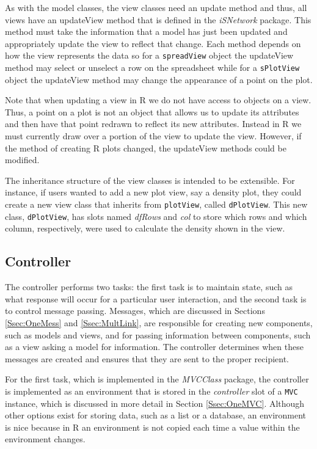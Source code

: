 \documentclass{article}[11pt]
\newcommand{\Rfunction}[1]{{\textsf{#1}}}
\newcommand{\Robject}[1]{{\texttt{#1}}}
\newcommand{\Rpackage}[1]{{\textit{#1}}}
\newcommand{\Rslot}[1]{\textsl{#1}}
\newcommand{\Rclass}[1]{\texttt{#1}}
\begin{document}
As with the model classes, the view classes need an update
method and thus, all views have an \Rfunction{updateView} method that is
defined in the \Rpackage{iSNetwork} package.  This method must take the
information that a model has just been updated and appropriately update the
view to reflect that change.  Each method depends on how the view
represents the data so for a \Robject{spreadView} object the
\Rfunction{updateView} method may select or unselect a row on the spreadsheet
while for a \Robject{sPlotView} object the \Rfunction{updateView} method may
change the appearance of a point on the plot.  

Note that when updating a view in \textsf{R} we do not have access to objects
on a view.  Thus, a point on a plot is not an object that allows us to update
its attributes and then have that point redrawn to reflect its new attributes.
Instead in \textsf{R} we must currently draw over a portion of the view to
update the view.  However, if the method of creating \textsf{R} plots changed,
the \Rfunction{updateView} methods could be modified. 

The inheritance structure of the view classes is intended to be
extensible.  For instance, if users wanted to add a new plot view, say a
density plot, they could create a new view class that inherits from
\Rclass{plotView}, called \Rclass{dPlotView}.  This new class,
\Rclass{dPlotView}, has slots named \Rslot{dfRows} and \Rslot{col} to store
which rows and which column, respectively, were used to calculate the density
shown in the view.

\subsection{Controller}
\label{Ssec:OneCont}

The controller performs two tasks: the first task is to maintain state,
such as what response will occur for a particular user interaction, 
and the second task is to control message passing.  Messages, which are
discussed in Sections \ref{Ssec:OneMess} and \ref{Ssec:MultLink}, are
responsible for creating new components, such as models and views, and for
passing information between components, such as a view asking a model for
information.  The controller determines when these messages are created and
ensures that they are sent to the proper recipient.

For the first task, which is implemented in the \Rpackage{MVCClass}
package, the controller is implemented as an environment that is stored in the
\Rslot{controller} slot of a \Robject{MVC} instance, which is discussed in
more detail in Section \ref{Ssec:OneMVC}.  Although other options exist for
storing data, such as a list or a database, an environment is nice because in
\textsf{R} an environment is not copied each time a value within the
environment changes.  
\end{document}
